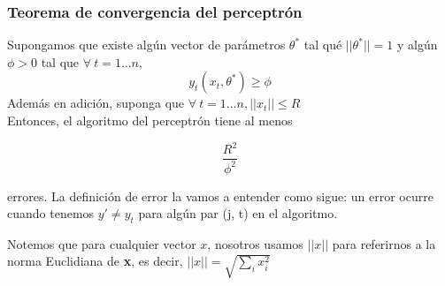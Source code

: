 \subsubsection{Teorema de convergencia del perceptrón}

\theoremstyle{plain}
\begin{theorem}
Supongamos que existe algún vector de parámetros $\theta^*$ tal qué
$||\theta^*|| = 1$ y algún $\phi > 0$ tal que $\forall\  t = 1 \dots n$,
\begin{equation*}
  y_t(x_t, \theta^*) \geq \phi
\end{equation*}
Además en adición, suponga que $\forall\  t = 1 \dots n, ||x_t|| \leq
R$\\
Entonces, el algoritmo del perceptrón tiene al menos

\begin{equation*}
  \frac{R^2}{\phi^2}
\end{equation*}

errores. La definición de error la vamos a entender como sigue: un
error ocurre cuando tenemos $y' \neq y_t$ para algún par (j, t) en el
algoritmo.
\end{theorem}

Notemos que para cualquier vector $x$, nosotros usamos $||x||$ para
referirnos a la norma Euclidiana de \textbf{x}, es decir,
$||x||=\sqrt{\displaystyle\sum_ix_i^2}$

